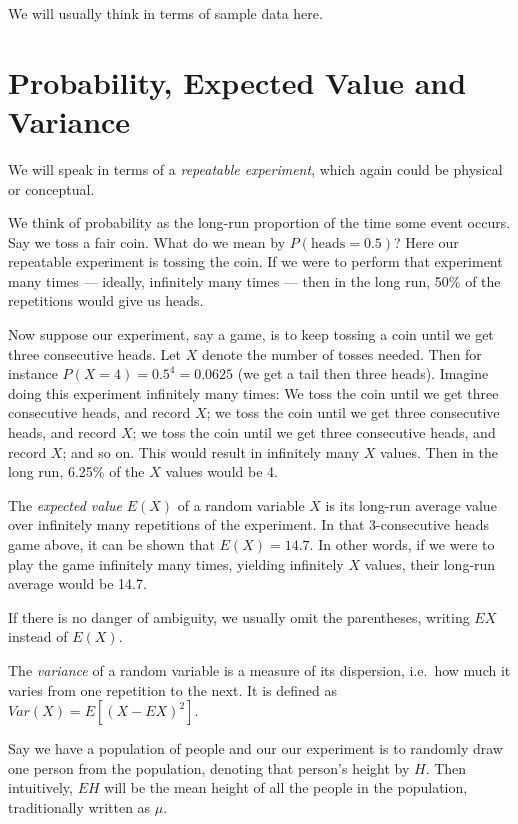 We will usually think in terms of sample data here.

\section{Probability, Expected Value and Variance}

We will speak in terms of a \textit{repeatable experiment}, which again
could be physical or conceptual.

We think of probability as the long-run proportion of the time some
event occurs.  Say we toss a fair coin.  What do we mean by
$P(\textrm{heads} = 0.5)$?  Here our repeatable experiment is tossing the
coin.  If we were to perform that experiment many times ---
ideally, infinitely many times --- then in the long run, 50\% of the
repetitions would give us heads.

Now suppose our experiment, say a game, is to keep tossing a coin until
we get three consecutive heads.  Let $X$ denote the number of tosses
needed.  Then for instance $P(X = 4) = 0.5^4 = 0.0625$ (we get a tail
then three heads).  Imagine doing this experiment infinitely many times:
We toss the coin until we get three consecutive heads, and record $X$;
we toss the coin until we get three consecutive heads, and record $X$;
we toss the coin until we get three consecutive heads, and record $X$;
and so on.  This would result in infinitely many $X$ values.  Then in
the long run, 6.25\% of the $X$ values would be 4.

The \textit{expected value} $E(X)$ of a random variable $X$ is its long-run
average value over infinitely many repetitions of the experiment.  In
that 3-consecutive heads game above, it can be shown that $E(X) = 14.7$.
In other words, if we were to play the game infinitely many times,
yielding infinitely $X$ values, their long-run average would be 14.7.

If there is no danger of ambiguity, we usually omit the parentheses,
writing $EX$ instead of $E(X)$.

The \textit{variance} of a random variable is a measure of its
dispersion, i.e.\ how much it varies from one repetition to the next.
It is defined as $Var(X) = E[(X - EX)^2]$.

Say we have a population of people and our our experiment is to 
randomly draw one person from the population, denoting that person's
height by $H$.  Then intuitively, $EH$ will be the mean height of all
the people in the population, traditionally written as $\mu$.

